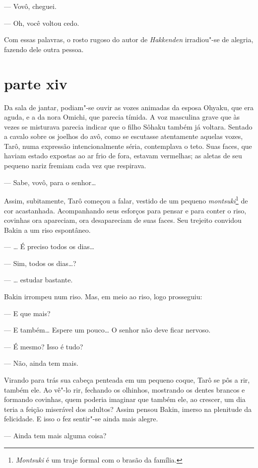 --- Vovô, cheguei.

--- Oh, você voltou cedo.

Com essas palavras, o rosto rugoso do autor de \textit{Hakkenden}
irradiou"-se de alegria, fazendo dele outra pessoa.

\section*{parte xiv}

Da sala de jantar, podiam"-se ouvir as vozes animadas da esposa Ohyaku, que
era aguda, e a da nora Omichi, que parecia tímida. A voz masculina
grave que às vezes se misturava parecia indicar que o filho Sôhaku
também já voltara. Sentado a cavalo sobre os joelhos do avô, como se
escutasse atentamente aquelas vozes, Tarô, numa expressão
intencionalmente séria, contemplava o teto. Suas faces, que haviam
estado expostas ao ar frio de fora, estavam vermelhas; as aletas de seu
pequeno nariz fremiam cada vez que respirava.

--- Sabe, vovô, para o senhor\ldots{}

Assim, subitamente, Tarô começou a falar, vestido de um pequeno
\textit{montsuki}\footnote{ \textit{Montsuki} é um traje formal
com o brasão da família.} de cor acastanhada. Acompanhando seus
esforços para pensar e para conter o riso, covinhas ora apareciam, ora
desapareciam de suas faces. Seu trejeito convidou Bakin a um riso
espontâneo.

--- \ldots{} É preciso todos os dias\ldots{}

--- Sim, todos os dias\ldots{}?

--- \ldots{} estudar bastante.

Bakin irrompeu num riso. Mas, em meio ao riso, logo prosseguiu:

--- E que mais?

--- E também\ldots{} Espere um pouco\ldots{} O senhor não deve ficar nervoso.

--- É mesmo? Isso é tudo?

--- Não, ainda tem mais.

Virando para trás sua cabeça penteada em um pequeno coque, Tarô se pôs a
rir, também ele. Ao vê"-lo rir, fechando os olhinhos, mostrando os
dentes brancos e formando covinhas, quem poderia imaginar que também
ele, ao crescer, um dia teria a feição miserável dos adultos? Assim
pensou Bakin, imerso na plenitude da felicidade. E isso o fez sentir"-se
ainda mais alegre.

--- Ainda tem mais alguma coisa?

